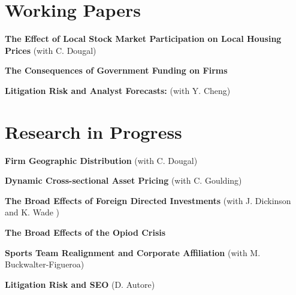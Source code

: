 \documentclass[letterpaper,11pt]{article}
\newcommand{\resumeSubHeadingListStart}{\begin{itemize}[leftmargin=0.15in, label={}]}
\newcommand{\resumeSubHeadingListEnd}{\end{itemize}}
\begin{document}

\section{Working Papers}
  \vspace{2pt}
  \resumeSubHeadingListStart
    \small{\item{
        
        \textbf{The Effect of Local Stock Market Participation on Local Housing Prices}{ (with C. Dougal)} \\ \vspace{3pt}

        \textbf{The Consequences of Government Funding on Firms}{ } \\ \vspace{3pt}
        
        \textbf{Litigation Risk and Analyst Forecasts:}{ (with Y. Cheng)} \\ \vspace{3pt}
        
    }}
  \resumeSubHeadingListEnd



\section{Research in Progress}
\vspace{2pt}
\resumeSubHeadingListStart
  \small{\item{

      \textbf{Firm Geographic Distribution}{ (with C. Dougal)} \\ \vspace{3pt}

      \textbf{Dynamic Cross-sectional Asset Pricing}{ (with C. Goulding)} \\ \vspace{3pt}

      \textbf{The Broad Effects of Foreign Directed Investments}{ (with J. Dickinson and K. Wade )} \\ \vspace{3pt}

      \textbf{The Broad Effects of the Opiod Crisis}{ } \\ \vspace{3pt}
      
      \textbf{Sports Team Realignment and Corporate Affiliation}{ (with M. Buckwalter-Figueroa)} \\ \vspace{3pt}
      
      \textbf{Litigation Risk and SEO}{ (D. Autore) } \\ \vspace{3pt}
      
  }}
\resumeSubHeadingListEnd
\end{document}
